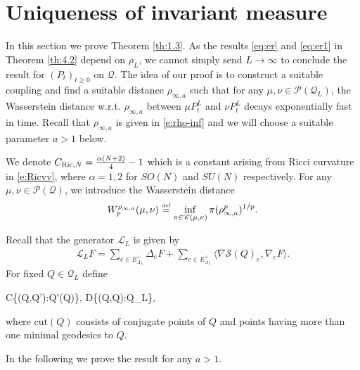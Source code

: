 \documentclass[11pt,UTF-8,reqno]{amsart}
\numberwithin{equation}{section}
\def\<{{\langle}}
\def\>{{\rangle}}
\def\Ric{{\rm Ricci}}
\newcommand{\eqdef}{\stackrel{\mbox{\tiny def}}{=}}
\def\cL{{\mathcal L}}
\def\cQ{{\mathcal Q}}
\def\cS{{\mathcal S}}
\def\sC{{\mathscr C}}
\def\sP{{\mathscr P}}
\def\geq{\geqslant}
\def\<{{\langle}}
\def\>{{\rangle}}
\def\Ric{{\rm Ric}}
\def\geq{\geqslant}
\def\<{\langle} \def\>{\rangle}
\begin{document}
\section{Uniqueness of invariant measure}
\label{sec:uniqueYM}



In this section we prove Theorem \ref{th:1.3}.
As the results \eqref{eq:er} and \eqref{eq:er1}   in Theorem \ref{th:4.2} depend on $\rho_L$,
we cannot simply send $L\to\infty$ to conclude the result for $(P_t)_{t\geq0}$ on $\cQ$.  The idea of our proof is to construct a suitable coupling and find a suitable distance $\rho_{\infty,a}$ such that
for any $\mu,\nu\in \sP(\cQ_L)$, the Wasserstein distance w.r.t. $\rho_{\infty, a}$  between  $\mu P_t^L$ and $\nu P_t^L$ decays exponentially fast in time. Recall that $\rho_{\infty, a}$ is given in \eqref{e:rho-inf}  and we will choose a suitable parameter $a>1$ below.

We denote $C_{\Ric,N}= \frac{\alpha(N+2)}4-1$ which is a constant arising from  Ricci curvature in \eqref{e:Ricvv},
where  $\alpha=1, 2$ for $SO(N)$ and $SU(N)$ %
respectively.
For any $\mu, \nu\in \sP(\cQ)$, we introduce the Wasserstein distance
\begin{align*}
	W_p^{\rho_{\infty,a}}(\mu,\nu)\eqdef \inf_{\pi\in \sC(\mu,\nu)}\pi(\rho_{\infty,a}^p)^{1/p}.
\end{align*}

Recall that the generator $\cL_L$ is given by
	\begin{align}
	\cL_L F=	\sum_{e\in E_{\Lambda_{L}}^+}\Delta_{e}F+\sum_{e\in E_{\Lambda_{L}}^+}\<\nabla \cS(Q)_e,\nabla_{e} F\>.
\end{align}
For fixed $Q\in \cQ_L$ define
\begin{equ}[e:CD]
	C\eqdef\{(Q,Q'):Q'\in {}(Q)\}, \quad D\eqdef \{(Q,Q):Q\in \cQ_L\},
\end{equ}
where $\text{cut}(Q)$ consists of conjugate points of $Q$ and points having more than one minimal geodesics to $Q$.



In the following we prove the result for any $a>1$.
\end{document}
